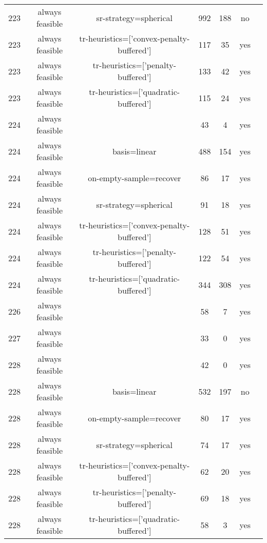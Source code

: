 \begin{scriptsize}
\begin{center}
\begin{longtable}{ccccccc}
223 & always feasible &                     sr-strategy=spherical &    992 &    188 &      no\\
223 & always feasible & tr-heuristics=['convex-penalty-buffered'] &    117 &     35 &     yes\\
223 & always feasible &        tr-heuristics=['penalty-buffered'] &    133 &     42 &     yes\\
223 & always feasible &      tr-heuristics=['quadratic-buffered'] &    115 &     24 &     yes\\
224 & always feasible &                                           &     43 &      4 &     yes\\
224 & always feasible &                              basis=linear &    488 &    154 &     yes\\
224 & always feasible &                   on-empty-sample=recover &     86 &     17 &     yes\\
224 & always feasible &                     sr-strategy=spherical &     91 &     18 &     yes\\
224 & always feasible & tr-heuristics=['convex-penalty-buffered'] &    128 &     51 &     yes\\
224 & always feasible &        tr-heuristics=['penalty-buffered'] &    122 &     54 &     yes\\
224 & always feasible &      tr-heuristics=['quadratic-buffered'] &    344 &    308 &     yes\\
226 & always feasible &                                           &     58 &      7 &     yes\\
227 & always feasible &                                           &     33 &      0 &     yes\\
228 & always feasible &                                           &     42 &      0 &     yes\\
228 & always feasible &                              basis=linear &    532 &    197 &      no\\
228 & always feasible &                   on-empty-sample=recover &     80 &     17 &     yes\\
228 & always feasible &                     sr-strategy=spherical &     74 &     17 &     yes\\
228 & always feasible & tr-heuristics=['convex-penalty-buffered'] &     62 &     20 &     yes\\
228 & always feasible &        tr-heuristics=['penalty-buffered'] &     69 &     18 &     yes\\
228 & always feasible &      tr-heuristics=['quadratic-buffered'] &     58 &      3 &     yes\\

\end{longtable}
\end{center}
\end{scriptsize}
